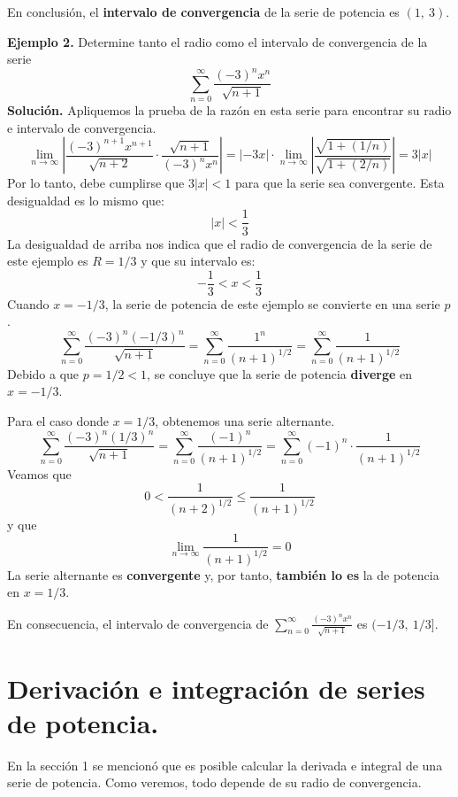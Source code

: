 \documentclass[12pt]{article}
\begin{document}
En conclusión, el \textbf{intervalo de convergencia} de la serie de potencia es $(1, \ 3)$.

\textbf{Ejemplo 2.} Determine tanto el radio como el intervalo de convergencia de la serie
\[
  \sum_{n = 0}^{\infty} \frac{(-3)^{n} x^{n}}{\sqrt{n + 1}}
\]
\textbf{Solución.} Apliquemos la prueba de la razón en esta serie para encontrar su radio e intervalo de convergencia.
\[
\lim_{n \to \infty} \left|\frac{(-3)^{n + 1} x^{n + 1}}{\sqrt{n + 2}} \cdot \frac{\sqrt{n + 1}}{(-3)^{n} x^{n}}\right|
  = |-3x| \cdot \lim_{n \to \infty} \left|\frac{\sqrt{1 + (1/n)}}{\sqrt{1 + (2/n)}}\right|
  = 3|x|
\]
Por lo tanto, debe cumplirse que $3|x| < 1$ para que la serie sea convergente. Esta desigualdad es lo mismo que:
\[
  |x| < \frac{1}{3}
\]
La desigualdad de arriba nos indica que el radio de convergencia de la serie de este ejemplo es $R = 1/3$ y que su intervalo es:
\[
  -\frac{1}{3} < x < \frac{1}{3}
\]
Cuando $x = -1/3$, la serie de potencia de este ejemplo se convierte en una serie $p$.
\[
  \sum_{n = 0}^{\infty} \frac{(-3)^{n} (-1/3)^{n}}{\sqrt{n + 1}} = \sum_{n = 0}^{\infty} \frac{1^{n}}{(n + 1)^{1/2}}
                                                                 = \sum_{n = 0}^{\infty} \frac{1}{(n + 1)^{1/2}}
\]
Debido a que $p = 1/2 < 1$, se concluye que la serie de potencia \textbf{diverge} en $x = -1/3$.

Para el caso donde $x = 1/3$, obtenemos una serie alternante.
\[
  \sum_{n = 0}^{\infty} \frac{(-3)^{n} (1/3)^{n}}{\sqrt{n + 1}} = \sum_{n = 0}^{\infty} \frac{(-1)^{n}}{(n + 1)^{1/2}}
                                                                = \sum_{n = 0}^{\infty} (-1)^{n} \cdot \frac{1}{(n + 1)^{1/2}}
\]
Veamos que
\[
  0 < \frac{1}{(n + 2)^{1/2}} \leq \frac{1}{(n + 1)^{1/2}}
\]
y que
\[
  \lim_{n \to \infty} \frac{1}{(n + 1)^{1/2}} = 0
\]
La serie alternante es \textbf{convergente} y, por tanto, \textbf{también lo es} la de potencia en $x = 1/3$.

En consecuencia, el intervalo de convergencia de $\sum_{n = 0}^{\infty} \frac{(-3)^{n} x^{n}}{\sqrt{n + 1}}$ es $(-1/3, \ 1/3]$.


\section{Derivación e integración de series de potencia.}

En la sección 1 se mencionó que es posible calcular la derivada e integral de una serie de potencia. Como veremos, todo depende de su radio de convergencia.
\end{document}
